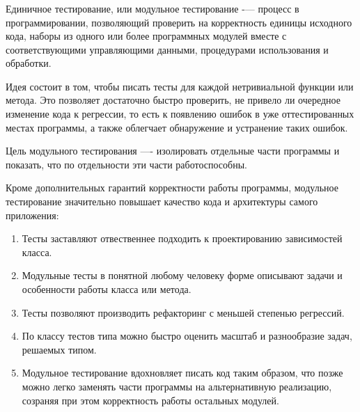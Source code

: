 \subsubsection{}
\label{sec:testing:unit:defenition}

Единичное тестирование, или модульное тестирование -— процесс в программировании, позволяющий проверить на корректность единицы исходного кода, наборы из одного или более программных модулей вместе с соответствующими управляющими данными, процедурами использования и обработки.

Идея состоит в том, чтобы писать тесты для каждой нетривиальной функции или метода. Это позволяет достаточно быстро проверить, не привело ли очередное изменение кода к регрессии, то есть к появлению ошибок в уже оттестированных местах программы, а также облегчает обнаружение и устранение таких ошибок. 

Цель модульного тестирования —- изолировать отдельные части программы и показать, что по отдельности эти части работоспособны. \cite{wiki:unit}

Кроме дополнительных гарантий корректности работы программы, модульное тестирование значительно повышает качество кода и архитектуры самого приложения:

\begin{enumerate}
	\item Тесты заставляют отвественнее подходить к проектированию зависимостей класса.
	\item Модульные тесты в понятной любому человеку форме описывают задачи и особенности работы класса или метода.
	\item Тесты позволяют производить рефакторинг с меньшей степенью регрессий.
	\item По классу тестов типа можно быстро оценить масштаб и разнообразие задач, решаемых типом.
	\item Модульное тестирование вдохновляет писать код таким образом, что позже можно легко заменять части программы на альтернативную реализацию, созраняя при этом корректность работы остальных модулей.
\end{enumerate}
